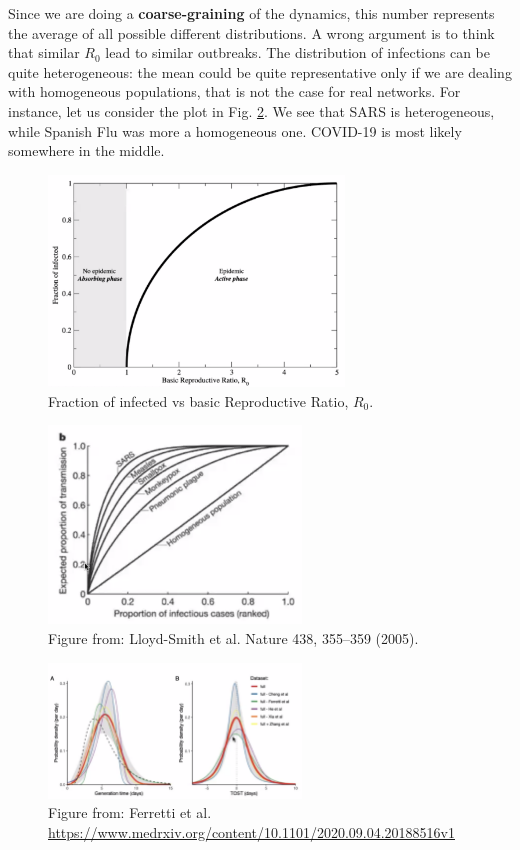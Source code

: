 \documentclass[../main/main.tex]{subfiles}
\begin{document}
Since we are doing a \textbf{coarse-graining} of the dynamics, this number represents the average of all possible different distributions. A wrong argument is to think that similar $R_0$ lead to similar outbreaks. The distribution of infections can be quite heterogeneous: the mean could be quite representative only if we are dealing with homogeneous populations, that is not the case for real networks. For instance, let us consider the plot in Fig. \ref{fig:3_outbreaks}. We see that SARS is heterogeneous, while Spanish Flu was more a homogeneous one. COVID-19 is most likely somewhere in the middle.

\begin{figure}[h!]
\centering
\includegraphics[width=0.7\textwidth]{../lessons/image/02/2_R_0.png}
\caption{\label{fig:2_R_0.png} Fraction of infected vs basic Reproductive Ratio, \( R_0 \).}
\end{figure}

\begin{figure}[h!]
\centering
\includegraphics[width=0.6\textwidth]{../lessons/image/02/3_outbreaks.png}
\caption{\label{fig:3_outbreaks} Figure from: Lloyd-Smith et al. Nature 438, 355–359 (2005).}
\end{figure}

\begin{figure}[h!]
\centering
\includegraphics[width=0.6\textwidth]{../lessons/image/02/4_TOST.png}
\caption{\label{fig:4_TOST} Figure from: Ferretti et al. \url{https://www.medrxiv.org/content/10.1101/2020.09.04.20188516v1}}
\end{figure}
\end{document}
